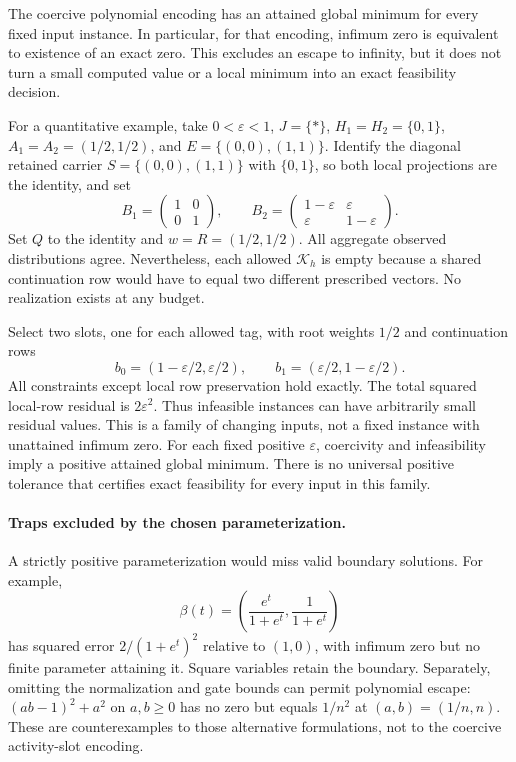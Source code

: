 \documentclass[11pt]{article}
\newcommand{\Kcal}{\mathcal K}
\theoremstyle{remark}
\begin{document}
The coercive polynomial encoding has an attained global minimum for every
fixed input instance.  In particular, for that encoding, infimum zero is
equivalent to existence of an exact zero.  This excludes an escape to
infinity, but it does not turn a small computed value or a local minimum
into an exact feasibility decision.

For a quantitative example, take $0<\varepsilon<1$,
$J=\{*\}$, $H_1=H_2=\{0,1\}$,
$A_1=A_2=(1/2,1/2)$, and
$E=\{(0,0),(1,1)\}$.  Identify the diagonal retained carrier $S=\{(0,0),(1,1)\}$
with $\{0,1\}$, so both local projections are the identity, and set
\[
 B_1=\begin{pmatrix}1&0\\0&1\end{pmatrix},\qquad
 B_2=\begin{pmatrix}1-\varepsilon&\varepsilon\\
                   \varepsilon&1-\varepsilon\end{pmatrix}.
\]
Set $Q$ to the identity and $w=R=(1/2,1/2)$.
All aggregate observed distributions agree.  Nevertheless, each allowed
$\Kcal_h$ is empty because a shared continuation row would have to equal two
different prescribed vectors.  No realization exists at any budget.

Select two slots, one for each allowed tag, with root weights $1/2$ and
continuation rows
\[
 b_0=(1-\varepsilon/2,\varepsilon/2),\qquad
 b_1=(\varepsilon/2,1-\varepsilon/2).
\]
All constraints except local row preservation hold exactly.  The total
squared local-row residual is $2\varepsilon^2$.  Thus infeasible instances
can have arbitrarily small residual values.  This is a family of changing
inputs, not a fixed instance with unattained infimum zero.  For each fixed
positive $\varepsilon$, coercivity and infeasibility imply a positive
attained global minimum.  There is no universal positive tolerance that
certifies exact feasibility for every input in this family.

\paragraph{Traps excluded by the chosen parameterization.}
A strictly positive parameterization would miss valid boundary solutions.
For example,
\[
 \beta(t)=\left(\frac{e^t}{1+e^t},\frac{1}{1+e^t}\right)
\]
has squared error $2/(1+e^t)^2$ relative to $(1,0)$, with infimum zero but
no finite parameter attaining it.  Square variables retain the boundary.
Separately, omitting the normalization and gate bounds can permit
polynomial escape: $(ab-1)^2+a^2$ on $a,b\geq0$ has no zero but equals
$1/n^2$ at $(a,b)=(1/n,n)$.  These are counterexamples to those alternative
formulations, not to the coercive activity-slot encoding.
\end{document}
